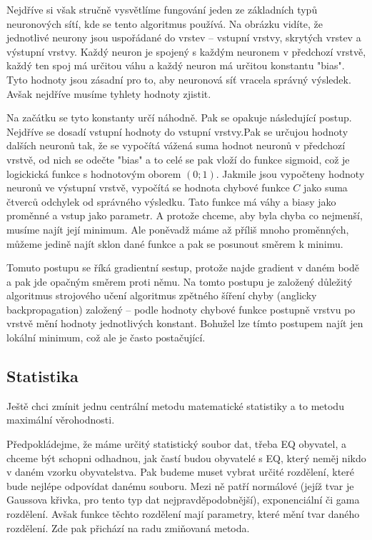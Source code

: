 \documentclass{fkssolpub}
\begin{document}
Nejdříve si však stručně vysvětlíme fungování jeden ze základních
typů neuronových sítí, kde se tento algoritmus používá. Na obrázku
vidíte, že jednotlivé neurony jsou uspořádané do vrstev -- vstupní vrstvy,
skrytých vrstev a výstupní vrstvy.  Každý neuron je spojený s každým 
neuronem v předchozí vrstvě, každý ten spoj má určitou váhu a každý neuron 
má určitou konstantu "bias". Tyto hodnoty jsou zásadní
pro to, aby neuronová síť vracela správný výsledek. Avšak nejdříve musíme
tyhlety hodnoty zjistit. \cite{3blue1brown_but_2017}

Na začátku se tyto konstanty určí náhodně. Pak se opakuje následující 
postup. Nejdříve se dosadí vstupní hodnoty
do vstupní vrstvy.Pak se určujou hodnoty dalších neuronů tak, že se vypočítá
vážená suma hodnot neuronů v předchozí vrstvě, od nich se odečte "bias" a to
celé se pak vloží do funkce sigmoid, což je logickická funkce s hodnotovým
oborem $(0;1)$. \cite{noauthor_sigmoid_2022} \cite{3blue1brown_but_2017}
Jakmile jsou vypočteny hodnoty neuronů ve
výstupní vrstvě, vypočítá se hodnota chybové funkce $C$ jako suma čtverců 
odchylek od správného výsledku. Tato funkce má váhy a biasy jako proměnné 
a vstup jako parametr. A protože chceme, aby byla chyba co nejmenší, 
musíme najít její minimum. Ale poněvadž máme až příliš mnoho proměnných, 
můžeme jedině najít sklon dané funkce a pak se posunout směrem k minimu.
\cite{3blue1brown_gradient_2017}

Tomuto postupu se říká gradientní sestup, protože najde gradient v daném
bodě a pak jde opačným směrem proti němu. Na tomto postupu je založený
důležitý algoritmus strojového učení algoritmus zpětného šíření chyby 
(anglicky backpropagation) založený -- podle hodnoty chybové funkce postupně 
vrstvu po vrstvě mění hodnoty jednotlivých konstant. Bohužel lze tímto postupem 
najít jen lokální minimum, což ale je často postačující. 
\cite{3blue1brown_gradient_2017}

\newpage

\subsection{Statistika}

Ještě chci zmínit jednu centrální metodu matematické statistiky a to metodu
maximální věrohodnosti. 

Předpokládejme, že máme určitý statistický soubor dat, třeba EQ obyvatel, 
a chceme být schopni odhadnou, jak častí budou obyvatelé s EQ,
který neměj nikdo v daném vzorku obyvatelstva. Pak budeme muset vybrat
určité rozdělení, které bude nejlépe odpovídat danému souboru. Mezi ně
patří normálové (jejíž tvar je Gaussova křivka, pro tento typ dat
nejpravděpodobnější), exponenciální či gama rozdělení. Avšak funkce
těchto rozdělení mají parametry, které mění tvar daného rozdělení. 
Zde pak přichází na radu zmiňovaná metoda. 
\cite{statquest_maximum_2017}
\end{document}
